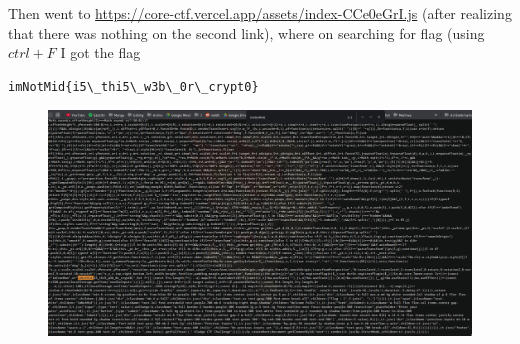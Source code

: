 \documentclass{article}
\begin{document}
\newline Then went to \url{https://core-ctf.vercel.app/assets/index-CCe0eGrI.js} (after realizing that there was nothing on the second link), where on searching for flag (using $ctrl+F$ I got the flag 
\begin{verbatim}
imNotMid{i5\_thi5\_w3b\_0r\_crypt0}
\end{verbatim}
\begin{figure}[h!]
    \centering
    \includegraphics[width=1\linewidth]{figs/wordle3.png}
    \label{fig:enter-label}
\end{figure}
\end{document}
